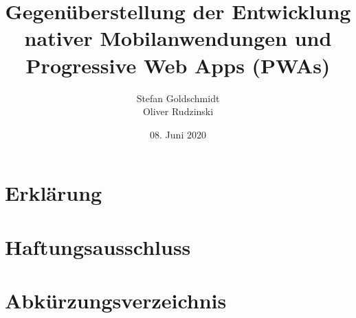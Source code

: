 


\title{Gegenüberstellung der Entwicklung\\nativer Mobilanwendungen und\\Progressive Web Apps (PWAs)} 
\author{Stefan Goldschmidt\\Oliver Rudzinski}
\date{08. Juni 2020}



\makeatletter
{}


	\clearpage
	
	\thispagestyle{empty}
	
	
	\clearpage
	\chapter*{Erklärung}
		
	\thispagestyle{empty}
	
	\clearpage
	\chapter*{Haftungsausschluss}
		
	\thispagestyle{empty}
	
	\clearpage
	
	\thispagestyle{empty}
	
	\tableofcontents
	\thispagestyle{empty}
	
	\chapter*{Abkürzungsverzeichnis}
		
	
	\listoffigures

	\listoftables

	\listoflistings


